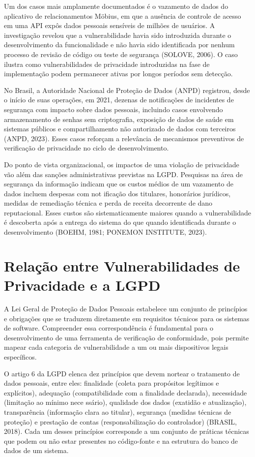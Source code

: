 \documentclass[oneside]{normas-utf-tex}
\begin{document}
Um dos casos mais amplamente documentados é o vazamento de dados do aplicativo de relacionamentos Möbius, em que a ausência de controle de acesso em uma API expôs dados pessoais sensíveis de milhões de usuários. A investigação revelou que a vulnerabilidade havia sido introduzida durante o desenvolvimento da funcionalidade e não havia sido identificada por nenhum processo de revisão de código ou teste de segurança (SOLOVE, 2006). O caso ilustra como vulnerabilidades de privacidade introduzidas na fase de implementação podem permanecer ativas por longos períodos sem detecção.

No Brasil, a Autoridade Nacional de Proteção de Dados (ANPD) registrou, desde o início de suas operações, em 2021, dezenas de notificações de incidentes de segurança com impacto sobre dados pessoais, incluindo casos envolvendo armazenamento de senhas sem criptografia, exposição de dados de saúde em sistemas públicos e compartilhamento não autorizado de dados com terceiros (ANPD, 2023). Esses casos reforçam a relevância de mecanismos preventivos de verificação de privacidade no ciclo de desenvolvimento.

Do ponto de vista organizacional, os impactos de uma violação de privacidade vão além das sanções administrativas previstas na LGPD. Pesquisas na área de segurança da informação indicam que os custos médios de um vazamento de dados incluem despesas com not ificação dos titulares, honorários jurídicos, medidas de remediação técnica e perda de receita decorrente de dano reputacional. Esses custos são sistematicamente maiores quando a vulnerabilidade é descoberta após a entrega do sistema do que quando identificada durante o desenvolvimento (BOEHM, 1981; PONEMON INSTITUTE, 2023).

\section{Relação entre Vulnerabilidades de Privacidade e a LGPD}

A Lei Geral de Proteção de Dados Pessoais estabelece um conjunto de princípios e obrigações que se traduzem diretamente em requisitos técnicos para os sistemas de software. Compreender essa correspondência é fundamental para o desenvolvimento de uma ferramenta de verificação de conformidade, pois permite mapear cada categoria de vulnerabilidade a um ou mais dispositivos legais específicos.

O artigo 6 da LGPD elenca dez princípios que devem nortear o tratamento de dados pessoais, entre eles: finalidade (coleta para propósitos legítimos e explícitos), adequação (compatibilidade com a finalidade declarada), necessidade (limitação ao mínimo nece ssário), qualidade dos dados (exatidão e atualização), transparência (informação clara ao titular), segurança (medidas técnicas de proteção) e prestação de contas (responsabilização do controlador) (BRASIL, 2018). Cada um desses princípios corresponde a um conjunto de práticas técnicas que podem ou não estar presentes no código-fonte e na estrutura do banco de dados de um sistema.
\end{document}
